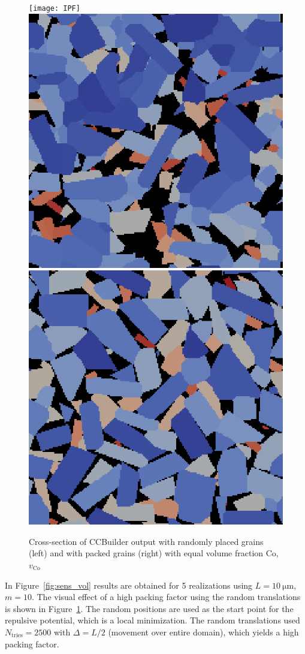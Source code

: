 \documentclass[3p,12pt]{elsarticle}
\newcommand{\Co}{\mathrm{Co}}
\begin{document}
\begin{figure}[H]
 \centering
  \texttt{[image: IPF]}
  \includegraphics[width=0.3\linewidth]{ccbuilder_random_cs}
  \includegraphics[width=0.3\linewidth]{ccbuilder_packed_cs}
  \caption{\label{fig:random_vs_packing} Cross-section of CCBuilder output with randomly placed grains (left) and with packed grains (right) with equal volume fraction Co, $v_\Co$}
\end{figure}


In Figure~\ref{fig:sens_vol} results are obtained for 5 realizations using $L=\SI{10}{\micro\meter}$, $m=10$.
The visual effect of a high packing factor using the random translations is shown in Figure~\ref{fig:random_vs_packing}.
The random positions are used as the start point for the repulsive potential, which is a local minimization.
The random translations used $N_\text{tries} = 2500$ with $\Delta = L/2$ (movement over entire domain), which yields a high packing factor.

\end{document}

